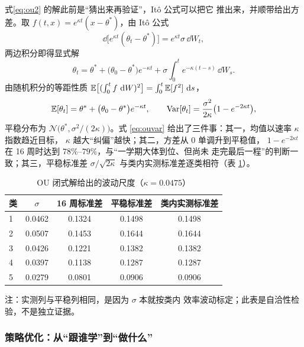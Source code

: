 式\eqref{eq:ou2} 的解此前是“猜出来再验证”，Itô 公式可以把它
推出来，并顺带给出方差。取 $f(t,x)=e^{\kappa t}(x-\theta^{*})$，由 Itô 公式
\begin{equation}
\dd\bigl[e^{\kappa t}(\theta_t-\theta^{*})\bigr]
=e^{\kappa t}\sigma\,\dd W_t ,
\end{equation}
两边积分即得显式解
\begin{equation}
\theta_t=\theta^{*}+\bigl(\theta_0-\theta^{*}\bigr)e^{-\kappa t}
+\sigma\int_0^{t}e^{-\kappa(t-s)}\,\dd W_s .
\label{eq:ousol}
\end{equation}
由随机积分的等距性质 $\mathbb{E}\bigl[(\int_0^t f\,\,\mathrm{d} W)^2\bigr]=\int_0^t\mathbb{E}[f^2]\,\,\mathrm{d} s$，
\begin{equation}
\mathbb{E}[\theta_t]=\theta^{*}+\bigl(\theta_0-\theta^{*}\bigr)e^{-\kappa t},\qquad
\operatorname{Var}[\theta_t]=\frac{\sigma^{2}}{2\kappa}\bigl(1-e^{-2\kappa t}\bigr),
\label{eq:ouvar}
\end{equation}
平稳分布为 $\mathcal{N}\bigl(\theta^{*},\sigma^{2}/(2\kappa)\bigr)$。式
\eqref{eq:ouvar} 给出了三件事：其一，均值以速率 $\kappa$ 指数趋近目标，
$\kappa$ 越大“纠偏”越快；其二，方差从 $0$ 单调升到平稳值，
$1-e^{-2\kappa t}$ 在 16 周时达到 $78\%$--$79\%$，与“一学期大体到位、但尚未
走完最后一程”的判断一致；其三，平稳标准差
$\sigma/\sqrt{2\kappa}$ 与类内实测标准差逐类相符（表 \ref{tab:ouvar}）。

\begin{table}[H]
\centering
\tabfont
\caption{OU 闭式解给出的波动尺度（$\kappa=0.0475$）}
\label{tab:ouvar}
\begin{tabular}{@{}lcccc@{}}
\toprule
类 & $\sigma$ & 16 周标准差 & 平稳标准差 & 类内实测标准差 \\
\midrule
1 & 0.0462 & 0.1324 & 0.1498 & 0.1498 \\
2 & 0.0507 & 0.1453 & 0.1644 & 0.1644 \\
3 & 0.0426 & 0.1221 & 0.1382 & 0.1382 \\
4 & 0.0397 & 0.1138 & 0.1287 & 0.1287 \\
5 & 0.0279 & 0.0801 & 0.0906 & 0.0906 \\
\bottomrule
\end{tabular}

\vspace{2pt}
\parbox{\textwidth}{\tabfont 注：实测列与平稳列相同，是因为 $\sigma$ 本就按类内
效率波动标定；此表是自洽性检验，不是独立证据。}
\end{table}

\subsubsection{策略优化：从“跟谁学”到“做什么”}

